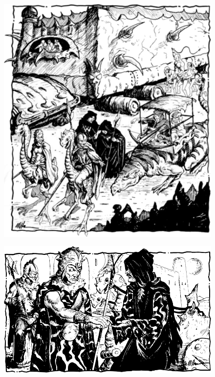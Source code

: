 \clearpage
\begin{figure}[t!]
\centering
\includegraphics[width=\columnwidth]{images/caravan-3.png}
\WOTC
\end{figure}


\begin{figure}[t!]
\centering
\includegraphics[width=\textwidth]{images/bribe-1.png}
\WOTC
\end{figure}
